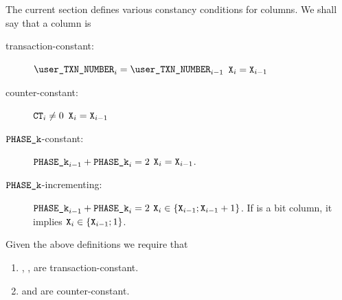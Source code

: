 The current section defines various constancy conditions for columns.
We shall say that a column  is
\begin{description}
	\item[transaction-constant:]
		\If $\userTransactionNumber_{i} = \userTransactionNumber_{i-1}$ \Then $\texttt{X}_{i} = \texttt{X}_{i-1}$
	\item[counter-constant:]
		\If $\texttt{CT}_{i} \neq 0$ \Then $\texttt{X}_{i} = \texttt{X}_{i-1}$
	\item[$\texttt{PHASE\_k}$-constant:]
		\If $\texttt{PHASE\_k}_{i-1} + \texttt{PHASE\_k}_{i} = 2$ \Then $\texttt{X}_{i} = \texttt{X}_{i-1}$.
	\item[$\texttt{PHASE\_k}$-incrementing:]
		\If $\texttt{PHASE\_k}_{i-1} + \texttt{PHASE\_k}_{i} = 2$ \Then $\texttt{X}_{i} \in \{\texttt{X}_{i-1}; \texttt{X}_{i-1} + 1 \}$. If  is a bit column, it implies $\texttt{X}_{i} \in \{\texttt{X}_{i-1}; 1 \}$.
\end{description}


Given the above definitions we require that
\begin{enumerate}
	\item \typeZeroTx{}, \typeOneTx{}, \typeTwoTx{} are transaction-constant. 
	\item \lt{} and \lx{} are counter-constant. 
\end{enumerate}
